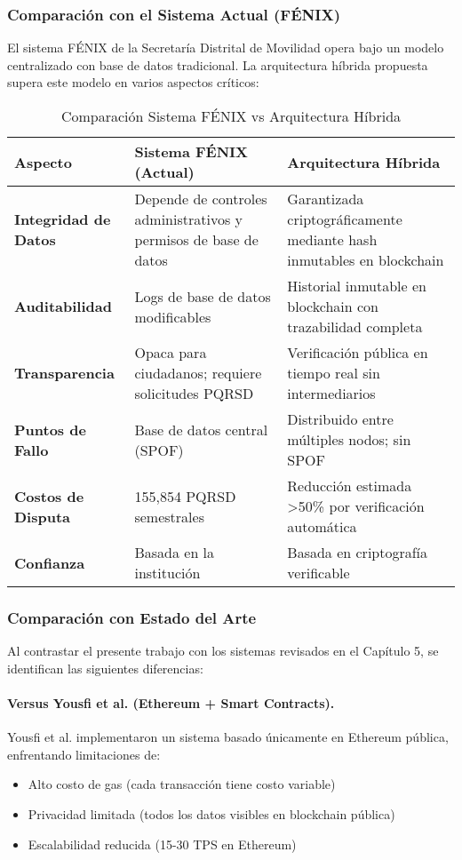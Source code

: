 \subsubsection{Comparación con el Sistema Actual (FÉNIX)}

El sistema FÉNIX de la Secretaría Distrital de Movilidad opera bajo un modelo centralizado con base de datos tradicional. La arquitectura híbrida propuesta supera este modelo en varios aspectos críticos:

\begin{table}[h]
\centering
\small
\begin{tabular}{|p{4cm}|p{5cm}|p{5cm}|}
\hline
\textbf{Aspecto} & \textbf{Sistema FÉNIX (Actual)} & \textbf{Arquitectura Híbrida} \\ \hline
\textbf{Integridad de Datos} & Depende de controles administrativos y permisos de base de datos & Garantizada criptográficamente mediante hash inmutables en blockchain \\ \hline
\textbf{Auditabilidad} & Logs de base de datos modificables & Historial inmutable en blockchain con trazabilidad completa \\ \hline
\textbf{Transparencia} & Opaca para ciudadanos; requiere solicitudes PQRSD & Verificación pública en tiempo real sin intermediarios \\ \hline
\textbf{Puntos de Fallo} & Base de datos central (SPOF) & Distribuido entre múltiples nodos; sin SPOF \\ \hline
\textbf{Costos de Disputa} & 155,854 PQRSD semestrales & Reducción estimada >50\% por verificación automática \\ \hline
\textbf{Confianza} & Basada en la institución & Basada en criptografía verificable \\ \hline
\end{tabular}
\caption{Comparación Sistema FÉNIX vs Arquitectura Híbrida}
\label{tab:comparacion_fenix}
\end{table}

\subsubsection{Comparación con Estado del Arte}

Al contrastar el presente trabajo con los sistemas revisados en el Capítulo 5, se identifican las siguientes diferencias:

\paragraph{Versus Yousfi et al. (Ethereum + Smart Contracts).}
Yousfi et al. implementaron un sistema basado únicamente en Ethereum pública, enfrentando limitaciones de:
\begin{itemize}
    \item Alto costo de gas (cada transacción tiene costo variable)
    \item Privacidad limitada (todos los datos visibles en blockchain pública)
    \item Escalabilidad reducida (15-30 TPS en Ethereum)
\end{itemize}

